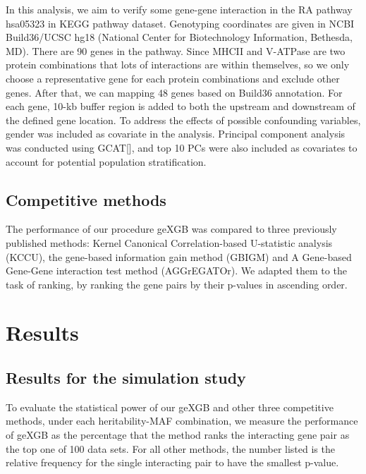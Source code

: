 \documentclass[11pt]{article}
\theoremstyle{plain}
\theoremstyle{definition}
\theoremstyle{remark}
\begin{document}
\noindent In this analysis, we aim to verify some gene-gene interaction in the RA pathway hsa05323 in KEGG pathway dataset. Genotyping coordinates are given in NCBI Build36/UCSC hg18 (National Center for Biotechnology Information, Bethesda, MD). There are 90 genes in the pathway. Since MHCII and V-ATPase are two protein combinations that lots of interactions are within themselves, so we only choose a representative gene for each protein combinations and exclude other genes. After that, we can mapping 48 genes based on Build36 annotation. For each gene, 10-kb buffer region is added to both the upstream and downstream of the defined gene location. To address the effects of possible confounding variables, gender was included as covariate in the analysis. Principal component analysis was conducted using GCAT[], and top 10 PCs were also included as covariates to account for potential population stratification.\\

\subsection{Competitive methods}
The performance of our procedure geXGB was compared to three previously published methods: Kernel Canonical Correlation-based U-statistic analysis (KCCU)\cite{4, 5}, the gene-based information gain method (GBIGM)\cite{6} and A Gene-based Gene-Gene interaction test method (AGGrEGATOr)\cite{7}. We adapted them to the task of ranking, by ranking the gene pairs by their p-values in ascending order.

\section{Results}

\subsection{Results for the simulation study}

To evaluate the statistical power of our geXGB and other three competitive methods, under each heritability-MAF combination, we measure the performance of geXGB as the percentage that the method ranks the interacting gene pair as the top one of 100 data sets. For all other methods, the number listed is the relative frequency for the single interacting pair to have the smallest p-value.\\
\end{document}

